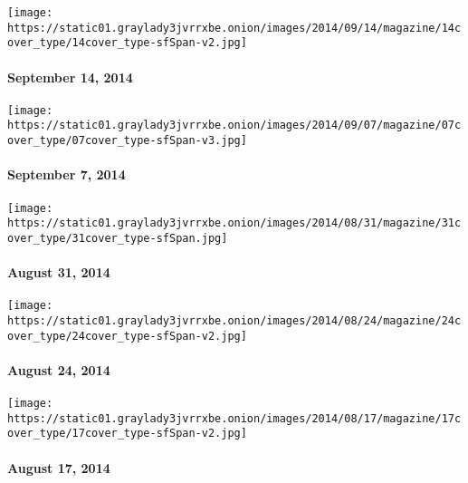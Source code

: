 \href{http://www.nytimes3xbfgragh.onion/indexes/2014/09/14/magazine/index.html}{}

\texttt{[image: https://static01.graylady3jvrrxbe.onion/images/2014/09/14/magazine/14cover\_type/14cover\_type-sfSpan-v2.jpg]}

\hypertarget{september-14-2014}{%
\paragraph{September 14, 2014}\label{september-14-2014}}

\href{http://www.nytimes3xbfgragh.onion/indexes/2014/09/07/magazine/index.html}{}

\texttt{[image: https://static01.graylady3jvrrxbe.onion/images/2014/09/07/magazine/07cover\_type/07cover\_type-sfSpan-v3.jpg]}

\hypertarget{september-7-2014}{%
\paragraph{September 7, 2014}\label{september-7-2014}}

\href{http://www.nytimes3xbfgragh.onion/indexes/2014/08/31/magazine/index.html}{}

\texttt{[image: https://static01.graylady3jvrrxbe.onion/images/2014/08/31/magazine/31cover\_type/31cover\_type-sfSpan.jpg]}

\hypertarget{august-31-2014}{%
\paragraph{August 31, 2014}\label{august-31-2014}}

\href{http://www.nytimes3xbfgragh.onion/indexes/2014/08/24/magazine/index.html}{}

\texttt{[image: https://static01.graylady3jvrrxbe.onion/images/2014/08/24/magazine/24cover\_type/24cover\_type-sfSpan-v2.jpg]}

\hypertarget{august-24-2014}{%
\paragraph{August 24, 2014}\label{august-24-2014}}

\href{http://www.nytimes3xbfgragh.onion/indexes/2014/08/17/magazine/index.html}{}

\texttt{[image: https://static01.graylady3jvrrxbe.onion/images/2014/08/17/magazine/17cover\_type/17cover\_type-sfSpan-v2.jpg]}

\hypertarget{august-17-2014}{%
\paragraph{August 17, 2014}\label{august-17-2014}}

